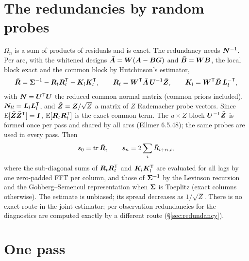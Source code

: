 \section{The redundancies by random probes}\label{sec:hutchinson}

$\Omega_n$ is a sum of products of residuals and is exact. The redundancy needs $\bm{N}^{-1}$. Per
arc, with the whitened designs $\bar{\bm{A}}=\bm{W}(\bm{A}-\bm{B}\bm{G})$ and $\bar{\bm{B}}=\bm{W}\bm{B}$, the
local block exact and the common block by Hutchinson's estimator,
\begin{equation}\label{eq:hutch}
\bar{\bm{R}}=\bm{\Sigma}^{-1}-\bm{R}_t\bm{R}_t^{\mathsf T}-\bm{K}_l\bm{K}_l^{\mathsf T},\qquad
\bm{R}_t=\bm{W}^{\mathsf T}\bar{\bm{A}}\,\bm{U}^{-1}\bar{\bm{Z}},\qquad
\bm{K}_l=\bm{W}^{\mathsf T}\bar{\bm{B}}\,\bm{L}_l^{-\mathsf T},
\end{equation}
with $\bm{N}=\bm{U}^{\mathsf T}\bm{U}$ the reduced common normal matrix (common priors included),
$\bm{N}_{ll}=\bm{L}_l\bm{L}_l^{\mathsf T}$, and $\bar{\bm{Z}}=\bm{Z}/\sqrt Z$ a matrix of $Z$ Rademacher probe
vectors. Since $\operatorname{E}[\bar{\bm{Z}}\bar{\bm{Z}}^{\mathsf T}]=\bm{I}$, $\operatorname{E}[\bm{R}_t\bm{R}_t^{\mathsf T}]$ is the exact common
term. The $u\times Z$ block $\bm{U}^{-1}\bar{\bm{Z}}$ is formed once per pass and shared by all arcs
(Ellmer 6.5.48); the same probes are used in every pass. Then
\begin{equation}
s_0=\operatorname{tr}\bar{\bm{R}},\qquad s_n=2\sum_i\bar R_{i+n,i},
\end{equation}
where the sub-diagonal sums of $\bm{R}_t\bm{R}_t^{\mathsf T}$ and $\bm{K}_l\bm{K}_l^{\mathsf T}$ are evaluated for all lags
by one zero-padded FFT per column, and those of $\bm{\Sigma}^{-1}$ by the Levinson recursion and the
Gohberg--Semencul representation when $\bm{\Sigma}$ is Toeplitz (exact columns otherwise). The
estimate is unbiased; its spread decreases as $1/\sqrt Z$. There is no exact route in the joint
estimator; per-observation redundancies for the diagnostics are computed exactly by a different
route (\S\ref{sec:redundancy}).

\section{One pass}\label{sec:pass}

